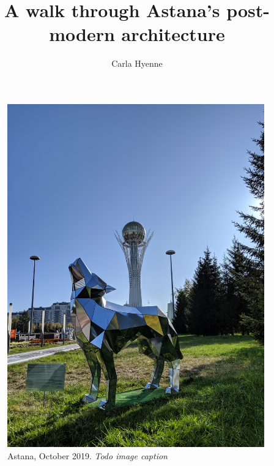 \documentclass{article}
\title{A walk through Astana's post-modern architecture}
\author{Carla Hyenne}
\begin{document}
\maketitle

\begin{figure}[h!]
	\centering
	\captionsetup{labelformat=empty}
	\includegraphics[height=40em]{photo_essay}
	\caption{Astana, October 2019. \textit{Todo image caption}}
\end{figure}

\pagebreak




\pagebreak

\printbibliography 
\end{document}
